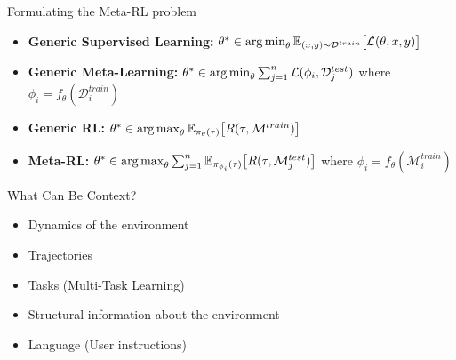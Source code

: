 \documentclass[aspectratio=169]{../latex_main/tntbeamer}  %
\begin{document}
\begin{frame}{Formulating the Meta-RL problem}
    \begin{itemize}
        \item \textbf{Generic Supervised Learning:} $\theta^* \in \operatorname*{arg\,min}_\theta \mathbb{E}_{(x,y) \sim \mathcal{D}^{train}} \big [\mathcal{L}(\theta, x, y) \big ]$ 
        \vfill
    
        \item \textbf{Generic Meta-Learning:} $\theta^* \in \operatorname*{arg\,min}_\theta \sum_{j=1}^n\mathcal{L}(\phi_i, \mathcal{D}^{test}_j)$ where $\phi_i = f_\theta (\mathcal{D}^{train}_i)$ 
        \vfill
    
        \item \textbf{Generic RL:} $\theta^* \in \operatorname*{arg\,max}_\theta \mathbb{E}_{\pi_\theta(\tau)}\big [ R(\tau, \mathcal{M}^{train}) \big ]$ 
        \vfill
        
        \item \textbf{Meta-RL:} $\theta^* \in \operatorname*{arg\,max}_\theta \sum_{j=1}^n \mathbb{E}_{\pi_{\phi_i} (\tau)}\big[ R(\tau, \mathcal{M}_j^{test}) \big ]$ where $\phi_i= f_\theta (\mathcal{M}^{train}_i)$
    \end{itemize}

\end{frame}

\begin{frame}{What Can Be Context?}
    \begin{itemize}
        \item Dynamics of the environment
        \item Trajectories
        \item Tasks (Multi-Task Learning)
        \item Structural information about the environment
        \item Language (User instructions) 
    \end{itemize}
\end{frame}
\end{document}
